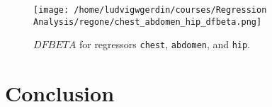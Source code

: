 \documentclass[11pt]{article}
\begin{document}
\begin{figure}[h]
\centering
\texttt{[image: /home/ludvigwgerdin/courses/Regression Analysis/regone/chest\_abdomen\_hip\_dfbeta.png]}
\caption{\label{fig:org734cdc2}
\(DFBETA\) for regressors \texttt{chest}, \texttt{abdomen}, and \texttt{hip}.}
\end{figure}

\section{Conclusion}
\label{sec:org06f9126}


\end{document}
